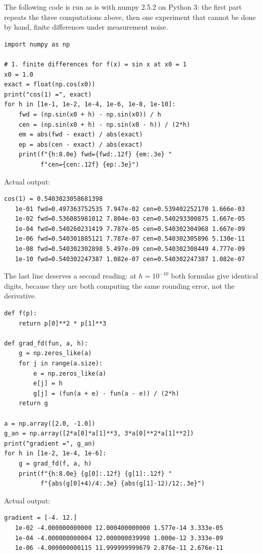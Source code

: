 The following code is run as is with numpy 2.5.2 on Python 3: the first part repeats the three
computations above, then one experiment that cannot be done by hand, finite differences under
measurement noise.

\begin{lab}
\begin{verbatim}
import numpy as np

# 1. finite differences for f(x) = sin x at x0 = 1
x0 = 1.0
exact = float(np.cos(x0))
print("cos(1) =", exact)
for h in [1e-1, 1e-2, 1e-4, 1e-6, 1e-8, 1e-10]:
    fwd = (np.sin(x0 + h) - np.sin(x0)) / h
    cen = (np.sin(x0 + h) - np.sin(x0 - h)) / (2*h)
    em = abs(fwd - exact) / abs(exact)
    ep = abs(cen - exact) / abs(exact)
    print(f"{h:8.0e} fwd={fwd:.12f} {em:.3e} "
          f"cen={cen:.12f} {ep:.3e}")
\end{verbatim}
Actual output:
\begin{verbatim}
cos(1) = 0.5403023058681398
   1e-01 fwd=0.497363752535 7.947e-02 cen=0.539402252170 1.666e-03
   1e-02 fwd=0.536085981012 7.804e-03 cen=0.540293300875 1.667e-05
   1e-04 fwd=0.540260231419 7.787e-05 cen=0.540302304968 1.667e-09
   1e-06 fwd=0.540301885121 7.787e-07 cen=0.540302305896 5.130e-11
   1e-08 fwd=0.540302302898 5.497e-09 cen=0.540302308449 4.777e-09
   1e-10 fwd=0.540302247387 1.082e-07 cen=0.540302247387 1.082e-07
\end{verbatim}
\end{lab}

The last line deserves a second reading: at $h=10^{-10}$ both formulas give identical digits,
because they are both computing the same rounding error, not the derivative.

\begin{lab}
\begin{verbatim}
def f(p):
    return p[0]**2 * p[1]**3

def grad_fd(fun, a, h):
    g = np.zeros_like(a)
    for j in range(a.size):
        e = np.zeros_like(a)
        e[j] = h
        g[j] = (fun(a + e) - fun(a - e)) / (2*h)
    return g

a = np.array([2.0, -1.0])
g_an = np.array([2*a[0]*a[1]**3, 3*a[0]**2*a[1]**2])
print("gradient =", g_an)
for h in [1e-2, 1e-4, 1e-6]:
    g = grad_fd(f, a, h)
    print(f"{h:8.0e} {g[0]:.12f} {g[1]:.12f} "
          f"{abs(g[0]+4)/4:.3e} {abs(g[1]-12)/12:.3e}")
\end{verbatim}
Actual output:
\begin{verbatim}
gradient = [-4. 12.]
   1e-02 -4.000000000000 12.000400000000 1.577e-14 3.333e-05
   1e-04 -4.000000000004 12.000000039998 1.000e-12 3.333e-09
   1e-06 -4.000000000115 11.999999999679 2.876e-11 2.676e-11
\end{verbatim}
\end{lab}

